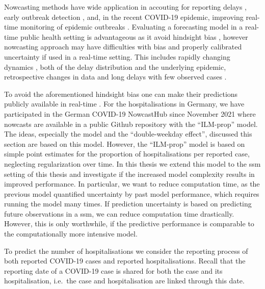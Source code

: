 Nowcasting methods have wide application in accouting for reporting delays \citep{Midthune2005Modeling}, early outbreak detection \citep{Salmon2015Bayesian,Bastos2019Modelling}, and, in the recent COVID-19 epidemic, improving real-time monitoring of epidemic outbreaks \citep{AnDerHeiden2020Schatzung,Gunther2021Nowcasting,Schneble2021Nowcasting,Akhmetzhanov2021Estimation}. Evaluating a forecasting model in a real-time public health setting is advantageous as it avoid hindsight bias \citep{Desai2019Realtime}, however nowcasting approach may have difficulties with bias and properly calibrated uncertainty if used in a real-time setting. This includes rapidly changing dynamics \citep{Gunther2021Nowcasting,vandeKassteele2019Nowcasting}, both of the delay distribution and the underlying epidemic, retrospective changes in data \citep{Midthune2005Modeling} and long delays with few observed cases \citep{Noufaily2015Modelling}. 

To avoid the aforementioned hindsight bias one can make their predictions publicly available in real-time \citep{Ray2020Ensemble,Bracher2021Preregistered}. For the hospitalisations in Germany, we have participated in the German COVID-19 NowcastHub \citep{2022Nowcasts} since November 2021 where nowcasts are available in a public Github repository \citep{2022Hospitalization} with the ``ILM-prop'' model. The ideas, especially the model and the ``double-weekday effect'', discussed this section are based on this model. However, the ``ILM-prop'' model is based on simple point estimates for the proportion of hospitalisations per reported case, neglecting regularization over time. In this thesis we extend this model to the \gls{ssm} setting of this thesis and investigate if the increased model complexity results in improved performance. In particular, we want to reduce computation time, as the previous model quantified uncertainty by past model performance, which requires running the model many times. If prediction uncertainty is based on predicting future observations in a \acrshort{ssm}, we can reduce computation time drastically. However, this is only worthwhile, if the predictive performance is comparable to the computationally more intensive model. 

To predict the number of hospitalisations we consider the reporting process of both reported COVID-19 cases and reported hospitalisations. Recall that the reporting date of a COVID-19 case is shared for both the case and its hospitalisation, i.e.~the case and hospitalisation are linked through this date.


